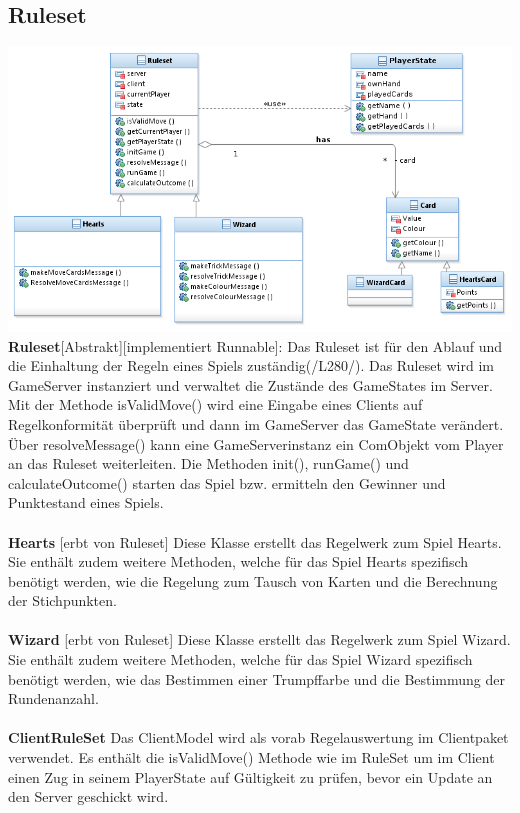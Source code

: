 \documentclass{article}
\begin{document}
\subsection{Ruleset}
\includegraphics[width=\textwidth]{Ruleset}
		\textbf{Ruleset}[Abstrakt][implementiert Runnable]: Das Ruleset  ist für den Ablauf und die Einhaltung der Regeln eines Spiels zuständig(/L280/). Das Ruleset wird im GameServer instanziert und verwaltet die Zustände des GameStates im Server. Mit der Methode isValidMove() wird eine Eingabe eines Clients auf Regelkonformität überprüft und dann im GameServer  das GameState verändert. Über resolveMessage() kann eine GameServerinstanz ein ComObjekt vom Player an das Ruleset weiterleiten. Die Methoden init(), runGame() und calculateOutcome() starten das Spiel bzw. ermitteln den Gewinner und Punktestand eines Spiels. \\ \\
		
		\textbf{Hearts} [erbt von Ruleset]  Diese Klasse erstellt das Regelwerk zum Spiel Hearts. Sie enthält zudem weitere Methoden, welche für das Spiel Hearts spezifisch benötigt werden, wie die Regelung zum Tausch von Karten und die Berechnung der Stichpunkten. \\ \\
		
		\textbf{Wizard} [erbt von Ruleset] Diese Klasse erstellt das Regelwerk zum Spiel Wizard. Sie enthält zudem weitere Methoden, welche für das Spiel Wizard spezifisch benötigt werden, wie das Bestimmen einer Trumpffarbe und die Bestimmung der Rundenanzahl. \\ \\
		
		\textbf{ClientRuleSet}  Das ClientModel wird als vorab Regelauswertung im Clientpaket verwendet. Es enthält die isValidMove() Methode wie im RuleSet um im Client einen Zug in seinem PlayerState auf Gültigkeit zu prüfen, bevor ein Update an den Server geschickt wird. \\ \\
		
\end{document}
